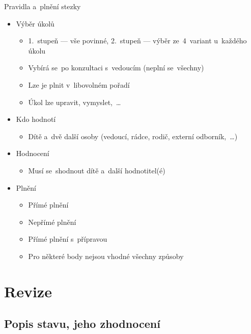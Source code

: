 \documentclass[compress, xelatex, 11pt, xcolor=dvipsnames, print, aspectratio=169,
	hyperref={
		bookmarks=true,
		unicode=true,
		colorlinks=true,
		pdftitle={Skautska vychovna metoda},
		plainpages=false,
		pdfauthor={Vojtech Zeisek},
		pdfsubject={Skautska vychovna metoda a jeji vyvoj za posledni stoleti a desetileti},
		pdfcreator={XeLaTeX},
		pdfkeywords={Junak, Pedagogika, Skaut, Skauting, Vychovna metoda},
		linkcolor=Red, %
		anchorcolor=ForestGreen, %
		citecolor=ForestGreen, %
		filecolor=ForestGreen, %
		menucolor=ForestGreen, %
		urlcolor=Sepia, %
		pdftex},
	url={hyphens, lowtilde} %
	]{beamer}
\begin{document}
\begin{frame}{Pravidla a~plnění stezky}
	\begin{itemize}
		\item Výběr úkolů
		\begin{itemize}
			\item 1.~stupeň --- vše povinné, 2.~stupeň --- výběr ze~4~variant u~každého úkolu
			\item Vybírá se~po konzultaci s~vedoucím (neplní se~všechny)
			\item Lze je plnit v~libovolném pořadí
			\item Úkol lze upravit, vymyslet,~\ldots
		\end{itemize}
		\item Kdo hodnotí
		\begin{itemize}
			\item Dítě a~dvě další osoby (vedoucí, rádce, rodič, externí odborník,~\ldots)
		\end{itemize}
		\item Hodnocení
		\begin{itemize}
			\item Musí se~shodnout dítě a~další hodnotitel(é)
		\end{itemize}
		\item Plnění
		\begin{itemize}
			\item Přímé plnění
			\item Nepřímé plnění
			\item Přímé plnění s~přípravou
			\item Pro některé body nejsou vhodné všechny způsoby
		\end{itemize}
	\end{itemize}
\end{frame}

\section{Revize}

\subsection{Popis stavu, jeho zhodnocení}
\end{document}
